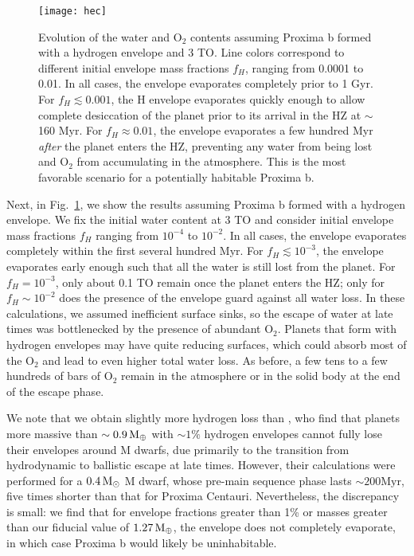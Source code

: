 \documentclass[preprint,12pt]{aastex}
\def\mearth{{\rm\,M_\oplus}}
\def\msun{{\rm\,M_\odot}}
\begin{document}
\begin{figure}[ht]
\centering
\texttt{[image: hec]}
\caption{Evolution of the water and O$_2$ contents assuming Proxima b
  formed with a hydrogen envelope and 3 TO. Line colors correspond to
  different initial envelope mass fractions $f_H$, ranging from 0.0001
  to 0.01. In all cases, the envelope evaporates completely prior to 1
  Gyr. For $f_H \lesssim 0.001$, the H envelope evaporates quickly
  enough to allow complete desiccation of the planet prior to its
  arrival in the HZ at $\sim$ 160 Myr. For $f_H \approx 0.01$, the
  envelope evaporates a few hundred Myr \emph{after} the planet enters
  the HZ, preventing any water from being lost and O$_2$ from
  accumulating in the atmosphere.  This is the most favorable scenario
  for a potentially habitable Proxima b.}
\label{fig:atmesc:hec}
\end{figure}

Next, in Fig.~\ref{fig:atmesc:hec}, we show the results assuming
Proxima b formed with a hydrogen envelope. We fix the initial water
content at 3 TO and consider initial envelope mass fractions $f_H$
ranging from $10^{-4}$ to $10^{-2}$. In all cases, the envelope
evaporates completely within the first several hundred Myr. For $f_H
\lesssim 10^{-3}$, the envelope evaporates early enough such that all
the water is still lost from the planet. For $f_H = 10^{-3}$, only
about 0.1 TO remain once the planet enters the HZ; only for $f_H \sim
10^{-2}$ does the presence of the envelope guard against all water
loss. In these calculations, we assumed inefficient surface sinks, so
the escape of water at late times was bottlenecked by the presence of
abundant O$_2$. Planets that form with hydrogen envelopes may have
quite reducing surfaces, which could absorb most of the O$_2$ and lead
to even higher total water loss. As before, a few tens to a few
hundreds of bars of O$_2$ remain in the atmosphere or in the solid
body at the end of the escape phase.

We note that we obtain slightly more hydrogen loss than
\cite{OwenMohanty16}, who find that planets more massive than $\sim
0.9 \mearth$ with $\sim 1\%$ hydrogen envelopes cannot fully lose
their envelopes around M dwarfs, due primarily to the transition from
hydrodynamic to ballistic escape at late times. However, their
calculations were performed for a $0.4 \msun$ M dwarf, whose pre-main
sequence phase lasts $\sim 200 \mathrm{Myr}$, five times shorter than
that for Proxima Centauri. Nevertheless, the discrepancy is small: we
find that for envelope fractions greater than 1\% or masses greater
than our fiducial value of $1.27 \mearth$, the envelope does not
completely evaporate, in which case Proxima b would likely be
uninhabitable.
\end{document}
